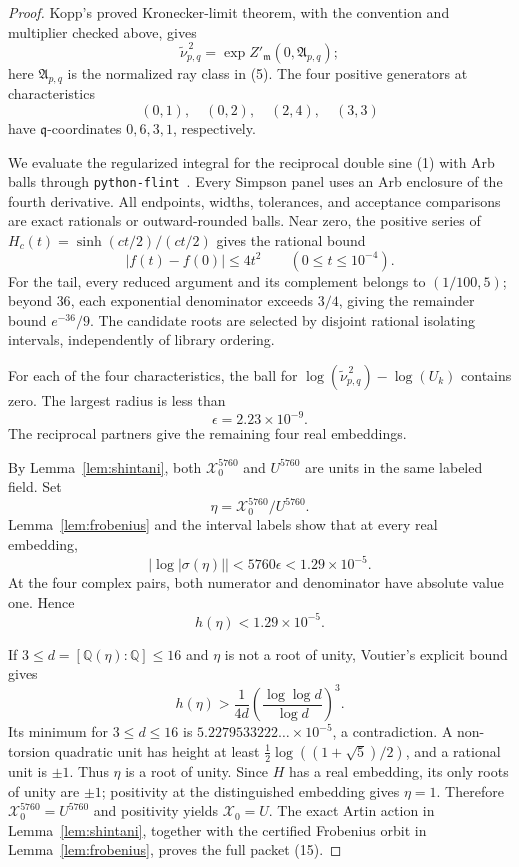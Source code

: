 \documentclass[11pt]{article}
\newcommand{\Q}{\mathbb Q}
\begin{document}
\begin{proof}
Kopp's proved Kronecker-limit theorem, with the convention and
multiplier checked above, gives
\[
 \widetilde\nu_{p,q}^{\,2}
 =\exp Z'_{\mathfrak m}(0,\mathfrak A_{p,q});
\tag{16}
\]
here $\mathfrak A_{p,q}$ is the normalized ray class in (5).
The four positive generators at characteristics
\[
 (0,1),\quad(0,2),\quad(2,4),\quad(3,3)
\]
have $\mathfrak q$-coordinates $0,6,3,1$, respectively.

We evaluate the regularized integral for the reciprocal double sine
(1) with Arb balls through \texttt{python-flint}~\cite{pythonflint}.
Every Simpson panel uses an Arb enclosure of the
fourth derivative.  All endpoints, widths, tolerances, and acceptance
comparisons are exact rationals or outward-rounded balls.  Near zero,
the positive series of
$H_c(t)=\sinh(ct/2)/(ct/2)$ gives the rational bound
\[
 |f(t)-f(0)|\le4t^2\qquad(0\le t\le10^{-4}).
\]
For the tail, every reduced argument and its complement belongs to
$(1/100,5)$; beyond $36$, each exponential denominator exceeds
$3/4$, giving the remainder bound $e^{-36}/9$.
The candidate roots are selected by disjoint rational isolating
intervals, independently of library ordering.

For each of the four characteristics, the ball for
$\log(\widetilde\nu_{p,q}^{\,2})-\log(U_k)$ contains zero.  The largest
radius is less than
\[
 \epsilon=2.23\times10^{-9}.
\]
The reciprocal partners give the remaining four real embeddings.

By Lemma~\ref{lem:shintani}, both
$\mathcal X_0^{5760}$ and $U^{5760}$ are units in the same labeled
field.  Set
\[
 \eta=\mathcal X_0^{5760}/U^{5760}.
\]
Lemma~\ref{lem:frobenius} and the interval labels show that at every
real embedding,
\[
 |\log|\sigma(\eta)||<5760\epsilon<1.29\times10^{-5}.
\]
At the four complex pairs, both numerator and denominator have
absolute value one.  Hence
\[
 h(\eta)<1.29\times10^{-5}.
\]

If $3\le d=[\Q(\eta):\Q]\le16$ and $\eta$ is not a root of unity,
Voutier's explicit bound \cite{Voutier1996} gives
\[
 h(\eta)>
 \frac1{4d}\left(\frac{\log\log d}{\log d}\right)^3.
\]
Its minimum for $3\le d\le16$ is
$5.2279533222\ldots\times10^{-5}$, a contradiction.  A non-torsion
quadratic unit has height at least
$\tfrac12\log((1+\sqrt5)/2)$, and a rational unit is $\pm1$.
Thus $\eta$ is a root of unity.  Since $H$ has a real embedding, its
only roots of unity are $\pm1$; positivity at the distinguished
embedding gives $\eta=1$.  Therefore
$\mathcal X_0^{5760}=U^{5760}$ and positivity yields
$\mathcal X_0=U$.  The exact Artin action in
Lemma~\ref{lem:shintani}, together with the certified Frobenius orbit
in Lemma~\ref{lem:frobenius}, proves the full packet (15).
\end{proof}
\end{document}
